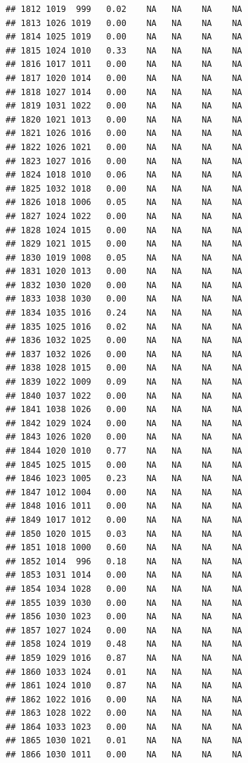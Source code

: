 \documentclass{article}\usepackage{graphicx, color}
\makeatletter
\newenvironment{kframe}{%
 \def\at@end@of@kframe{}%
 \ifinner\ifhmode%
  \def\at@end@of@kframe{\end{minipage}}%
  \begin{minipage}{\columnwidth}%
 \fi\fi%
 \def\FrameCommand##1{\hskip\@totalleftmargin \hskip-\fboxsep
 \colorbox{shadecolor}{##1}\hskip-\fboxsep
     \hskip-\linewidth \hskip-\@totalleftmargin \hskip\columnwidth}%
 \MakeFramed {\advance\hsize-\width
   \@totalleftmargin\z@ \linewidth\hsize
   \@setminipage}}%
 {\par\unskip\endMakeFramed%
 \at@end@of@kframe}
\newenvironment{knitrout}{}{} %
\makeatother
\begin{document}
\begin{knitrout}
\begin{kframe}
\begin{verbatim}
## 1812 1019  999   0.02    NA   NA    NA    NA
## 1813 1026 1019   0.00    NA   NA    NA    NA
## 1814 1025 1019   0.00    NA   NA    NA    NA
## 1815 1024 1010   0.33    NA   NA    NA    NA
## 1816 1017 1011   0.00    NA   NA    NA    NA
## 1817 1020 1014   0.00    NA   NA    NA    NA
## 1818 1027 1014   0.00    NA   NA    NA    NA
## 1819 1031 1022   0.00    NA   NA    NA    NA
## 1820 1021 1013   0.00    NA   NA    NA    NA
## 1821 1026 1016   0.00    NA   NA    NA    NA
## 1822 1026 1021   0.00    NA   NA    NA    NA
## 1823 1027 1016   0.00    NA   NA    NA    NA
## 1824 1018 1010   0.06    NA   NA    NA    NA
## 1825 1032 1018   0.00    NA   NA    NA    NA
## 1826 1018 1006   0.05    NA   NA    NA    NA
## 1827 1024 1022   0.00    NA   NA    NA    NA
## 1828 1024 1015   0.00    NA   NA    NA    NA
## 1829 1021 1015   0.00    NA   NA    NA    NA
## 1830 1019 1008   0.05    NA   NA    NA    NA
## 1831 1020 1013   0.00    NA   NA    NA    NA
## 1832 1030 1020   0.00    NA   NA    NA    NA
## 1833 1038 1030   0.00    NA   NA    NA    NA
## 1834 1035 1016   0.24    NA   NA    NA    NA
## 1835 1025 1016   0.02    NA   NA    NA    NA
## 1836 1032 1025   0.00    NA   NA    NA    NA
## 1837 1032 1026   0.00    NA   NA    NA    NA
## 1838 1028 1015   0.00    NA   NA    NA    NA
## 1839 1022 1009   0.09    NA   NA    NA    NA
## 1840 1037 1022   0.00    NA   NA    NA    NA
## 1841 1038 1026   0.00    NA   NA    NA    NA
## 1842 1029 1024   0.00    NA   NA    NA    NA
## 1843 1026 1020   0.00    NA   NA    NA    NA
## 1844 1020 1010   0.77    NA   NA    NA    NA
## 1845 1025 1015   0.00    NA   NA    NA    NA
## 1846 1023 1005   0.23    NA   NA    NA    NA
## 1847 1012 1004   0.00    NA   NA    NA    NA
## 1848 1016 1011   0.00    NA   NA    NA    NA
## 1849 1017 1012   0.00    NA   NA    NA    NA
## 1850 1020 1015   0.03    NA   NA    NA    NA
## 1851 1018 1000   0.60    NA   NA    NA    NA
## 1852 1014  996   0.18    NA   NA    NA    NA
## 1853 1031 1014   0.00    NA   NA    NA    NA
## 1854 1034 1028   0.00    NA   NA    NA    NA
## 1855 1039 1030   0.00    NA   NA    NA    NA
## 1856 1030 1023   0.00    NA   NA    NA    NA
## 1857 1027 1024   0.00    NA   NA    NA    NA
## 1858 1024 1019   0.48    NA   NA    NA    NA
## 1859 1029 1016   0.87    NA   NA    NA    NA
## 1860 1033 1024   0.01    NA   NA    NA    NA
## 1861 1024 1010   0.87    NA   NA    NA    NA
## 1862 1022 1016   0.00    NA   NA    NA    NA
## 1863 1028 1022   0.00    NA   NA    NA    NA
## 1864 1033 1023   0.00    NA   NA    NA    NA
## 1865 1030 1021   0.01    NA   NA    NA    NA
## 1866 1030 1011   0.00    NA   NA    NA    NA

\end{verbatim}
\end{kframe}
\end{knitrout}
\end{document}
